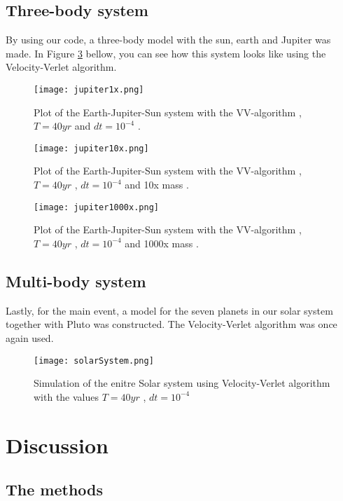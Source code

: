 \documentclass{article}
\begin{document}
\subsection{Three-body system}
By using our code, a three-body model with the sun, earth and Jupiter was made. In Figure \ref{fig: 2body} bellow, you can see how this system looks like using the Velocity-Verlet algorithm. 

\begin{figure}[H]
	\centering
	\texttt{[image: jupiter1x.png]}
	\centering
	\caption{ Plot of the Earth-Jupiter-Sun system with the VV-algorithm , $T = 40yr$ and $dt =10^{-4} $  .  }
	\label{fig: 2body}
\end{figure}

\begin{figure}[H]
	\centering
	\texttt{[image: jupiter10x.png]}
	\centering
	\caption{ Plot of the Earth-Jupiter-Sun system with the VV-algorithm , $T = 40yr$ , $dt =10^{-4} $  and 10x mass .  }
	\label{fig: 2body}
\end{figure}

\begin{figure}[H]
	\centering
	\texttt{[image: jupiter1000x.png]}
	\centering
	\caption{ Plot of the Earth-Jupiter-Sun system with the VV-algorithm , $T = 40yr$ , $dt =10^{-4} $  and 1000x mass . }
	\label{fig: 2body}
\end{figure}
\subsection{Multi-body system}
Lastly, for the main event, a model for the seven planets in our solar system together with Pluto was constructed. The Velocity-Verlet algorithm was once again used.
\begin{figure}[H]
\centering
\parbox{7cm}{
\texttt{[image: solarSystem.png]}
\label{fig:2figsA}}
\qquad
\caption{Simulation of the enitre Solar system using Velocity-Verlet algorithm with the values $T = 40yr$ , $dt =10^{-4} $  }
\end{figure}

\section{Discussion }

\subsection{The methods}
\end{document}
